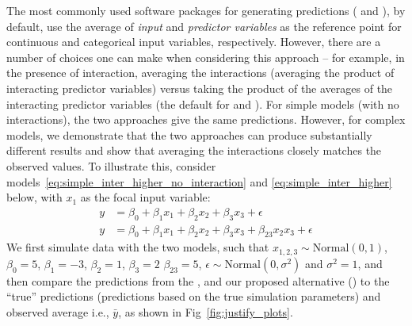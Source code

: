 The most commonly used  software packages for generating predictions ( and ), by default, use the average of \emph{input} and \emph{predictor variables} as the reference point for continuous and categorical input variables, respectively. However, there are a number of choices one can make when considering this approach -- for example, in the presence of interaction, averaging the interactions (averaging the product of interacting predictor variables) versus taking the product of the averages of the interacting predictor variables (the default for  and ). For simple models (with no interactions), the two approaches give the same predictions. However, for complex models, we demonstrate that the two approaches can produce substantially different results and show that averaging the interactions closely matches the observed values. To illustrate this, consider models~\ref{eq:simple_inter_higher_no_interaction} and \ref{eq:simple_inter_higher} below, with $x_1$ as the focal input variable:
%
\begin{align}
y &= \beta_0 + \beta_1x_1 + \beta_2x_2 + \beta_3x_3 + \epsilon \label{eq:simple_inter_higher_no_interaction}\\
y &= \beta_0 + \beta_1x_1 + \beta_2x_2 + \beta_3x_3 + \beta_{23}x_2x_3 + \epsilon \label{eq:simple_inter_higher}
\end{align}
%
We first simulate data with the two models, such that $x_{1,2,3} \sim \mathrm{Normal}(0, 1)$, $\beta_0 = 5$, $\beta_1 = -3$, $\beta_2 = 1$, $\beta_3 = 2$ $\beta_{23} = 5$, $\epsilon \sim \mathrm{Normal}(0, \sigma^2)$ and $\sigma^2 = 1$, and then compare the predictions from the ,  and our proposed alternative () to the ``true'' predictions (predictions based on the true simulation parameters) and observed average i.e., $\bar{y}$, as shown in Fig~\ref{fig:justify_plots}.
%
